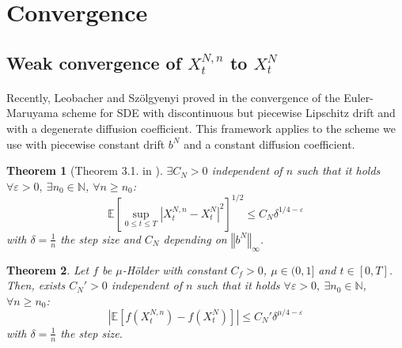 \documentclass[11pt]{article}
\newtheorem{theo}{Theorem}
\newcommand{\norme}[1]{\left\Vert #1\right\Vert}
\newcommand{\N}{\mathbb{N}}
\newcommand{\E}{\mathbb{E}}
\begin{document}

\newpage
\section{Convergence} 
    
    \subsection{Weak convergence of $X_t^{N,n}$ to $X_t^N$}
            \paragraph{}
            Recently, Leobacher and Szölgyenyi proved in \cite{Leo-Szo} the convergence of the Euler-Maruyama scheme for SDE with discontinuous but piecewise Lipschitz drift and with a degenerate diffusion coefficient. This framework applies to the scheme we use with piecewise constant drift $b^N$ and a constant diffusion coefficient.
    
       \begin{theo}[Theorem 3.1. in \cite{Leo-Szo}]\label{leo}
           $\exists C_N>0$ independent of $n$ such that it holds  $\forall \varepsilon >0,\ \exists n_0\in\N$, $\forall n\geq n_0$:
           \begin{equation}
            \E\left[\underset{0\leq t\leq T}{\sup}\left|X^{N,n}_t-X^N_t\right|^2\right]^{1/2}\leq C_N\delta^{1/4-\varepsilon}
            \end{equation}
            with $\delta=\frac{1}{n}$ the step size and $C_N$ depending on $\norme{b^N}_\infty$.
        \end{theo}
    
        \begin{theo}
            Let $f$ be $\mu$-Hölder with constant $C_f>0$, $\mu\in(0,1]$ and $t\in[0,T]$. Then, exists $C_N'>0$ independent of $n$ such that it holds  $\forall \varepsilon >0,\ \exists n_0\in\N$, $\forall n\geq n_0$:
            \begin{equation}
            \left|\E\left[f\left(X_t^{N,n}\right)-f\left(X_t^N\right)\right]\right| \leq C_N'\delta^{\mu/4-\varepsilon}
            \end{equation}                       
            with $\delta=\frac{1}{n}$ the step size.
        \end{theo}
    
\end{document}
